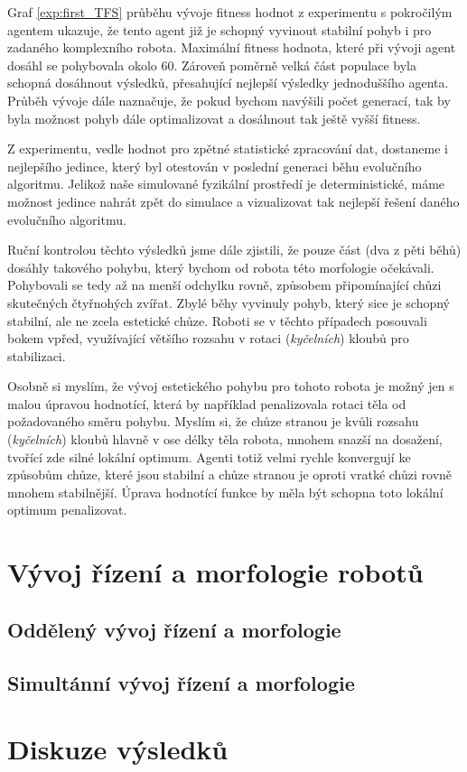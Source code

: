 Graf \ref{exp:first_TFS} průběhu vývoje fitness hodnot z experimentu s
pokročilým agentem ukazuje, že tento agent již je schopný vyvinout stabilní
pohyb i pro zadaného komplexního robota. Maximální fitness hodnota, které při
vývoji agent dosáhl se pohybovala okolo 60. Zároveň poměrně velká část populace
byla schopná dosáhnout výsledků, přesahující nejlepší výsledky jednoduššího
agenta. Průběh vývoje dále naznačuje, že pokud bychom navýšili počet generací,
tak by byla možnost pohyb dále optimalizovat a dosáhnout tak ještě vyšší
fitness. 

Z experimentu, vedle hodnot pro zpětné statistické zpracování dat, dostaneme i
nejlepšího jedince, který byl otestován v poslední generaci běhu evolučního
algoritmu. Jelikož naše simulované fyzikální prostředí je deterministické,
máme možnost jedince nahrát zpět do simulace a vizualizovat tak nejlepší řešení
daného evolučního algoritmu. 

Ruční kontrolou těchto výsledků jsme dále zjistili, že pouze část (dva z pěti
běhů) dosáhly takového pohybu, který bychom od robota této morfologie
očekávali. Pohybovali se tedy až na menší odchylku rovně, způsobem
připomínající chůzi skutečných čtyřnohých zvířat. Zbylé běhy vyvinuly pohyb,
který sice je schopný stabilní, ale ne zcela estetické chůze. Roboti se v
těchto případech posouvali bokem vpřed, využívající většího rozsahu v rotaci
(\emph{kyčelních}) kloubů pro stabilizaci.

Osobně si myslím, že vývoj estetického pohybu pro tohoto robota je možný jen s
malou úpravou hodnotící, která by například penalizovala rotaci těla od
požadovaného směru pohybu. Myslím si, že chůze stranou je kvůli rozsahu
(\emph{kyčelních}) kloubů hlavně v ose délky těla robota, mnohem snazší na
dosažení, tvořící zde silné lokální optimum. Agenti totiž velmi rychle
konvergují ke způsobům chůze, které jsou stabilní a chůze stranou je oproti
vratké chůzi rovně mnohem stabilnější. Úprava hodnotící funkce by měla
být schopna toto lokální optimum penalizovat.

\section{Vývoj řízení a morfologie robotů} \label{exp2}
\subsection{Oddělený vývoj řízení a morfologie}
\subsection{Simultánní vývoj řízení a morfologie}

\section{Diskuze výsledků}
